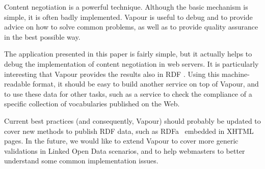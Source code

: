 \documentclass{../templates/llncs}
\begin{document}
Content negotiation is a powerful technique. Although the basic mechanism is simple,
it is often badly implemented. Vapour is useful to debug and to provide advice on how to solve common problems, as well as to provide quality 
assurance in the best possible way.


The application presented in this paper is fairly simple, but  
it actually helps to debug the implementation of content negotiation in web servers. It
is particularly interesting that Vapour provides the results also in RDF . Using this machine-readable 
format, it should be easy to build another service on top of Vapour, and to use these data for 
other tasks, such as a service to check the compliance of a specific collection 
of vocabularies published on the Web.

Current best practices (and consequently, Vapour) should probably be
updated to cover new methods to publish RDF data, such as
RDFa~\cite{Birbeck2006} embedded in XHTML pages. In the future, we would like
to extend Vapour to cover more generic validations in Linked
Open Data scenarios, and to help webmasters to better understand some common
implementation issues.



\end{document}
